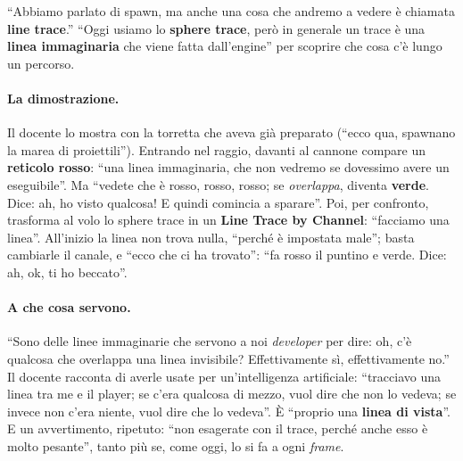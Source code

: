 ``Abbiamo parlato di spawn, ma anche una cosa che andremo a vedere è chiamata
\textbf{line trace}.'' ``Oggi usiamo lo \textbf{sphere trace}, però in generale un trace
è una \textbf{linea immaginaria} che viene fatta dall'engine'' per scoprire che cosa c'è
lungo un percorso.

\paragraph{La dimostrazione.} Il docente lo mostra con la torretta che aveva già
preparato (``ecco qua, spawnano la marea di proiettili''). Entrando nel raggio, davanti
al cannone compare un \textbf{reticolo rosso}: ``una linea immaginaria, che non vedremo
se dovessimo avere un eseguibile''. Ma ``vedete che è rosso, rosso, rosso; se
\emph{overlappa}, diventa \textbf{verde}. Dice: ah, ho visto qualcosa! E quindi comincia
a sparare''. Poi, per confronto, trasforma al volo lo sphere trace in un \textbf{Line
Trace by Channel}: ``facciamo una linea''. All'inizio la linea non trova nulla, ``perché
è impostata male''; basta cambiarle il canale, e ``ecco che ci ha trovato'': ``fa rosso
il puntino e verde. Dice: ah, ok, ti ho beccato''.

\paragraph{A che cosa servono.} ``Sono delle linee immaginarie che servono a noi
\emph{developer} per dire: oh, c'è qualcosa che overlappa una linea invisibile?
Effettivamente sì, effettivamente no.'' Il docente racconta di averle usate per
un'intelligenza artificiale: ``tracciavo una linea tra me e il player; se c'era qualcosa
di mezzo, vuol dire che non lo vedeva; se invece non c'era niente, vuol dire che lo
vedeva''. È ``proprio una \textbf{linea di vista}''. E un avvertimento, ripetuto:
``non esagerate con il trace, perché anche esso è molto pesante'', tanto più se, come
oggi, lo si fa a ogni \emph{frame}.

